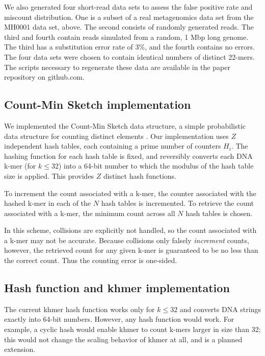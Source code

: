 \documentclass[10pt]{article}
\begin{document}
We also generated four short-read data sets to assess the false
positive rate and miscount distribution. One is a subset of a real
metagenomics data set from the MH0001 data set, above. The second
consists of randomly generated reads. The third and fourth contain
reads simulated from a random, 1 Mbp long genome.  The third has a
substitution error rate of 3\%, and the fourth contains no errors. The
four data sets were chosen to contain identical numbers of distinct
22-mers.  The scripts necessary to regenerate these data are available
in the paper repository on github.com.

\subsection*{Count-Min Sketch implementation}

We implemented the Count-Min Sketch data structure, a simple
probabilistic data structure for counting distinct elements
\cite{Cormode2005}.  Our implementation uses $Z$ independent hash
tables, each containing a prime number of counters $H_i$.  The hashing
function for each hash table is fixed, and reversibly converts each
DNA k-mer (for $k \le 32$) into a 64-bit number to which the modulus of
the hash table size is applied.  This provides $Z$ distinct hash
functions.

To increment the count associated with a k-mer, the counter associated
with the hashed k-mer in each of the $N$ hash tables is incremented.
To retrieve the count associated with a k-mer, the minimum count
across all $N$ hash tables is chosen.

In this scheme, collisions are explicitly not handled, so the count
associated with a k-mer may not be accurate. Because collisions only
falsely {\em increment} counts, however, the retrieved count for any
given k-mer is guaranteed to be no less than the correct count.  Thus
the counting error is one-sided.

\subsection*{Hash function and khmer implementation}

The current khmer hash function works only for $k \le 32$ and converts
DNA strings exactly into 64-bit numbers.  However, any hash function
would work. For example, a cyclic hash would enable khmer to count
k-mers larger in size than 32; this would not change the scaling
behavior of khmer at all, and is a planned extension.
\end{document}

